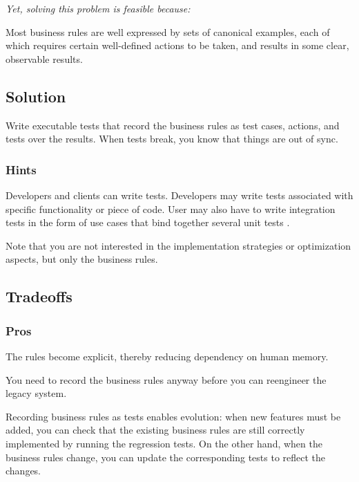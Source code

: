 \documentclass[a4paper,10pt,twoside]{book}
\begin{document}
\emph{Yet, solving this problem is feasible because:}

\begin{bulletlist}
\item Most business rules are well expressed by sets of canonical examples, each of which requires certain well-defined actions to be taken, and results in some clear, observable results.
\end{bulletlist}

\subsection*{Solution}

Write executable tests that record the business rules as test cases, actions, and tests over the results. When tests break, you know that things are out of sync.

\subsubsection*{Hints}

\begin{bulletlist}
\item Developers and clients can write tests. Developers may write tests associated with specific functionality or piece of code. User may also have to write integration tests in the form of use cases that bind together several unit tests \cite{Davi95a} \cite{Beck00a}. 
\item Note that you are not interested in the implementation strategies or optimization aspects, but only the business rules. 
\end{bulletlist}

\subsection*{Tradeoffs}

\subsubsection*{Pros}

\begin{bulletlist}
\item The rules become explicit, thereby reducing dependency on human memory.
\item You need to record the business rules anyway before you can reengineer the legacy system.
\item Recording business rules as tests enables evolution: when new features must be added, you can check that the existing business rules are still correctly implemented by running the regression tests. On the other hand, when the business rules change, you can update the corresponding tests to reflect the changes.
\end{bulletlist}
\end{document}

